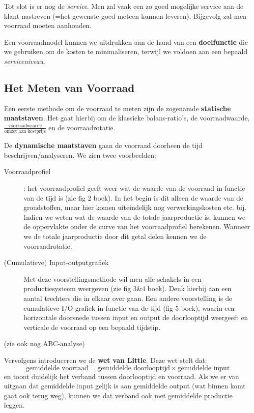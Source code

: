 Tot slot is er nog de \textit{service}. Men zal vaak een zo goed mogelijke service aan de klant nastreven (=het gewenste goed meteen kunnen leveren). Bijgevolg zal men voorraad moeten aanhouden.

Een voorraadmodel kunnen we uitdrukken aan de hand van een \textbf{doelfunctie} die we gebruiken om de kosten te minimaliseren, terwijl we voldoen aan een bepaald \textit{serviceniveau}.


\subsection{Het Meten van Voorraad}
Een eerste methode om de voorraad te meten zijn de zogenamde \textbf{statische maatstaven}. Het gaat hierbij om de klassieke balans-ratio's, de voorraadwaarde, $\frac{\text{voorraadwaarde}}{\text{omzet aan kostprijs}}$ en de voorraadrotatie.

De \textbf{dynamische maatstaven} gaan de voorraad doorheen de tijd beschrijven/analyseren. We zien twee voorbeelden:
\begin{description}
    \item[Voorraadprofiel]: het voorraadprofiel geeft weer wat de waarde van de voorraad in functie van de tijd is (zie fig 2 boek). In het begin is dit alleen de waarde van de grondstoffen, maar hier komen uiteindelijk nog verwerkingskosten etc. bij. Indien we weten wat de waarde van de totale jaarproductie is, kunnen we de oppervlakte onder de curve van het voorraadprofiel berekenen. Wanneer we de totale jaarproductie door dit getal delen kennen we de voorraadrotatie.

    \item[(Cumulatieve) Input-outputgrafiek] Met deze voorstellingsmethode wil men alle schakels in een productiesysteem weergeven (zie fig 3\&4 boek). Denk hierbij aan een aantal trechters die in elkaar over gaan. Een andere voorstelling is de cumulatieve I/O grafiek in functie van de tijd (fig 5 boek), waarin een horizontale doorsnede tussen input en output de doorlooptijd weergeeft en verticale de voorraad op een bepaald tijdstip.
\end{description}
(zie ook nog ABC-analyse)

Vervolgens introduceren we de \textbf{wet van Little}. Deze wet stelt dat:
\begin{equation}
    \boxed{\text{gemiddelde voorraad} = \text{gemiddelde doorlooptijd} \times \text{gemiddelde input}}
\end{equation}
en toont duidelijk het verband tussen doorlooptijd en voorraad. Als we er van uitgaan dat gemiddelde input gelijk is aan gemiddelde output (wat binnen komt gaat ook terug weg), kunnen we dat verband ook met gemiddelde productie leggen.
